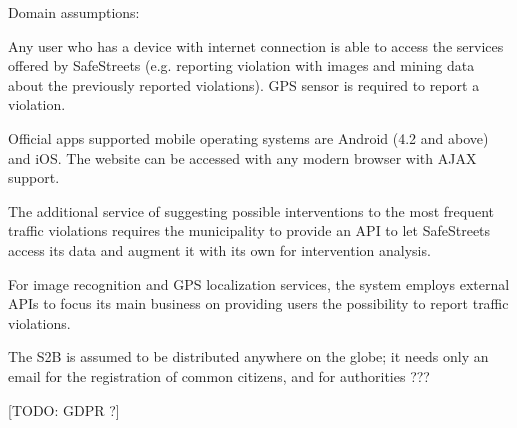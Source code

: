 Domain assumptions:
\begin{enumerate}[label={D\arabic*.}]
	 \label{D_email}
     \label{D_reports}
     \label{D_occurrency}
     \label{D_mun_availability}
   	 \label{D_mun_accuracy}
     \label{D_supervisor}
     \label{D_gps}
     \label{D_internet}
     \label{D_city_auth}
     \label{D_pce}
     \label{D_pce_api}
\end{enumerate}

Any user who has a device with internet connection is able to access the services offered by SafeStreets (e.g. reporting violation with images and mining data about the previously reported violations). GPS sensor is required to report a violation.

Official apps supported mobile operating systems are Android (4.2 and above) and iOS. The website can be accessed with any modern browser with AJAX support.

The additional service of suggesting possible interventions to the most frequent traffic violations requires the municipality to provide an API to let SafeStreets access its data and augment it with its own for intervention analysis.

For image recognition and GPS localization services, the system employs external APIs to focus its main business on providing users the possibility to report traffic violations.

The S2B is assumed to be distributed anywhere on the globe; it needs only an email for the registration of common citizens, and for authorities ???

[TODO: GDPR ?]